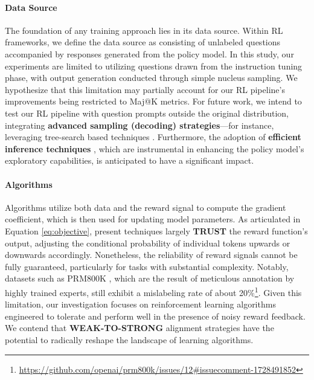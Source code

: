 \begin{itemize}[topsep=0pt]
\begin{itemize}[topsep=0pt]
\paragraph{Data Source} The foundation of any training approach lies in its data source. Within RL frameworks, we define the data source as consisting of unlabeled questions accompanied by responses generated from the policy model. In this study, our experiments are limited to utilizing questions drawn from the instruction tuning phase, with output generation conducted through simple nucleus sampling. We hypothesize that this limitation may partially account for our RL pipeline's improvements being restricted to Maj@K metrics. For future work, we intend to test our RL pipeline with question prompts outside the original distribution, integrating \textbf{advanced sampling (decoding) strategies}—for instance, leveraging tree-search based techniques \citep{yao2023tree}. Furthermore, the adoption of \textbf{efficient inference techniques} \citep{xia-etal-2023-speculative,leviathan2023fast,kwon2023efficient,xia2024unlocking}, which are instrumental in enhancing the policy model's exploratory capabilities, is anticipated to have a significant impact.

\paragraph{Algorithms} Algorithms utilize both data and the reward signal to compute the gradient coefficient, which is then used for updating model parameters. As articulated in Equation \ref{eq:objective}, present techniques largely \textbf{TRUST} the reward function’s output, adjusting the conditional probability of individual tokens upwards or downwards accordingly. Nonetheless, the reliability of reward signals cannot be fully guaranteed, particularly for tasks with substantial complexity. Notably, datasets such as PRM800K \citep{lightman2023let}, which are the result of meticulous annotation by highly trained experts, still exhibit a mislabeling rate of about 20\%\footnote{\url{https://github.com/openai/prm800k/issues/12\#issuecomment-1728491852}}. Given this limitation, our investigation focuses on reinforcement learning algorithms engineered to tolerate and perform well in the presence of noisy reward feedback. We contend that \textbf{WEAK-TO-STRONG} alignment strategies \citep{burns2023weak} have the potential to radically reshape the landscape of learning algorithms.


\end{itemize}
\end{itemize}
